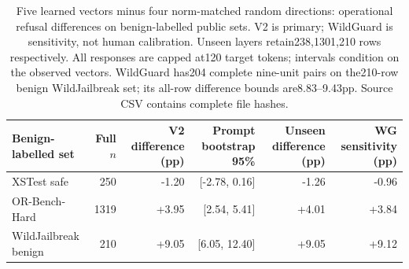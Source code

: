 \begin{table}[t]
\centering\small
\begin{tabular}{lrrrrr}
\toprule
Benign-labelled set & Full $n$ & V2 difference (pp) & Prompt bootstrap 95\% & Unseen difference (pp) & WG sensitivity (pp) \\
\midrule
XSTest safe & 250 & -1.20 & [-2.78, 0.16] & -1.26 & -0.96 \\
OR-Bench-Hard & 1319 & +3.95 & [2.54, 5.41] & +4.01 & +3.84 \\
WildJailbreak benign & 210 & +9.05 & [6.05, 12.40] & +9.05 & +9.12 \\
\bottomrule
\end{tabular}
\caption{Five learned vectors minus four norm-matched random directions: operational refusal differences on benign-labelled public sets. V2 is primary; WildGuard is sensitivity, not human calibration. Unseen layers retain238,1301,210 rows respectively. All responses are capped at120 target tokens; intervals condition on the observed vectors. WildGuard has204 complete nine-unit pairs on the210-row benign WildJailbreak set; its all-row difference bounds are8.83--9.43pp. Source CSV contains complete file hashes.}
\label{tab:public-refusal-nine}
\end{table}
